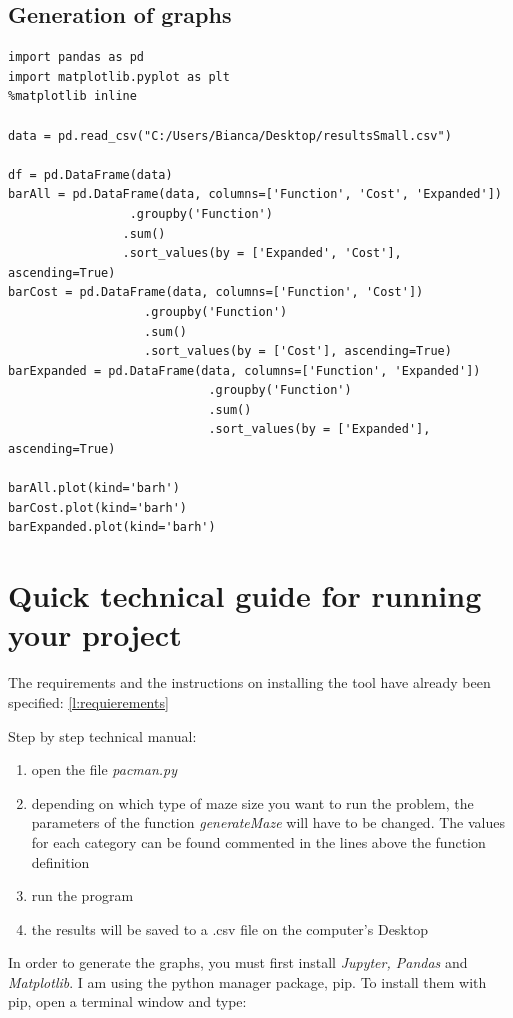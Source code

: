 \documentclass[a4paper,12pt]{report}
\begin{document}
\section{Generation of graphs}
\label{code:01}
\begin{Verbatim}[frame=single]
import pandas as pd
import matplotlib.pyplot as plt
%matplotlib inline

data = pd.read_csv("C:/Users/Bianca/Desktop/resultsSmall.csv")

df = pd.DataFrame(data)
barAll = pd.DataFrame(data, columns=['Function', 'Cost', 'Expanded'])
                 .groupby('Function')
                .sum()
                .sort_values(by = ['Expanded', 'Cost'], ascending=True)
barCost = pd.DataFrame(data, columns=['Function', 'Cost'])
                   .groupby('Function')
                   .sum()
                   .sort_values(by = ['Cost'], ascending=True)
barExpanded = pd.DataFrame(data, columns=['Function', 'Expanded'])
                            .groupby('Function')
                            .sum()
                            .sort_values(by = ['Expanded'], ascending=True)

barAll.plot(kind='barh')
barCost.plot(kind='barh')
barExpanded.plot(kind='barh')
\end{Verbatim}


\chapter{Quick technical guide for running your project}

The requirements and the instructions on installing the tool have already been specified: \ref{l:requierements}

Step by step technical manual:

\begin{enumerate}
\item open the file \textit{pacman.py}
\item depending on which type of maze size you want to run the problem, the parameters of the function \textit{generateMaze} will have to be changed. The values for each category can be found commented in the lines above the function definition
\item run the program
\item the results will be saved to a .csv file on the computer's Desktop
\end{enumerate}

In order to generate the graphs, you must first install \textit{Jupyter, Pandas} and \textit{Matplotlib}. I am using the python manager package, pip. To install them with pip, open a terminal window and type:
\end{document}
